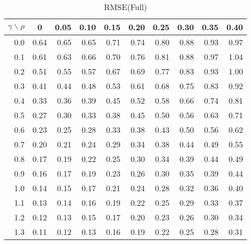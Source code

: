 \documentclass[12pt]{article}
\begin{document}
%
\begin{table}[!tbp]
\caption{RMSE(Full)}
 \begin{center}
 \begin{tabular}{r|rrrrrrrrr}\hline\hline
\multicolumn{1}{c|}{$\gamma\backslash\rho$}&\multicolumn{1}{c}{0}&\multicolumn{1}{c}{0.05}&\multicolumn{1}{c}{0.10}&\multicolumn{1}{c}{0.15}&\multicolumn{1}{c}{0.20}&\multicolumn{1}{c}{0.25}&\multicolumn{1}{c}{0.30}&\multicolumn{1}{c}{0.35}&\multicolumn{1}{c}{0.40}\tabularnewline
\hline

0.0&0.64&0.65&0.65&0.71&0.74&0.80&0.88&0.93&0.97\tabularnewline
0.1&0.61&0.63&0.66&0.70&0.76&0.81&0.88&0.97&1.04\tabularnewline
0.2&0.51&0.55&0.57&0.67&0.69&0.77&0.83&0.93&1.00\tabularnewline
0.3&0.41&0.44&0.48&0.53&0.61&0.68&0.75&0.83&0.92\tabularnewline
0.4&0.33&0.36&0.39&0.45&0.52&0.58&0.66&0.74&0.81\tabularnewline
0.5&0.27&0.30&0.33&0.38&0.45&0.50&0.56&0.63&0.71\tabularnewline
0.6&0.23&0.25&0.28&0.33&0.38&0.43&0.50&0.56&0.62\tabularnewline
0.7&0.20&0.21&0.24&0.29&0.34&0.38&0.44&0.49&0.55\tabularnewline
0.8&0.17&0.19&0.22&0.25&0.30&0.34&0.39&0.44&0.49\tabularnewline
0.9&0.16&0.17&0.19&0.23&0.26&0.30&0.35&0.39&0.44\tabularnewline
1.0&0.14&0.15&0.17&0.21&0.24&0.28&0.32&0.36&0.40\tabularnewline
1.1&0.13&0.14&0.16&0.19&0.22&0.25&0.29&0.33&0.37\tabularnewline
1.2&0.12&0.13&0.15&0.17&0.20&0.23&0.26&0.30&0.34\tabularnewline
1.3&0.11&0.12&0.13&0.16&0.19&0.22&0.25&0.28&0.31\tabularnewline
\hline
\end{tabular}

\end{center}

\end{table}
\end{document}
